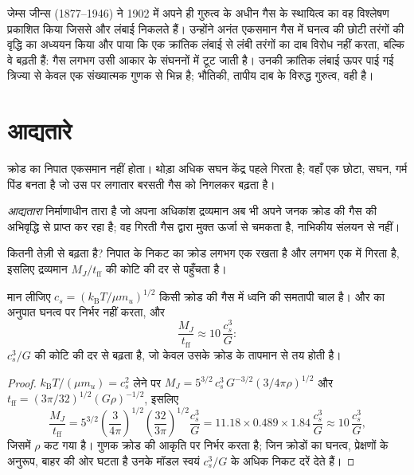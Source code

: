 \begin{history}[जेम्स जीन्स]
जेम्स जीन्स (1877--1946) ने 1902 में अपने ही गुरुत्व के अधीन गैस के स्थायित्व का
वह विश्लेषण प्रकाशित किया जिससे  और लंबाई निकलते हैं। उन्होंने
अनंत एकसमान गैस में घनत्व की छोटी तरंगों की वृद्धि का अध्ययन किया और
पाया कि एक क्रांतिक लंबाई से लंबी तरंगों का दाब विरोध नहीं करता,
बल्कि वे बढ़ती हैं: गैस लगभग उसी आकार के संघननों में टूट जाती है। उनकी क्रांतिक
लंबाई ऊपर पाई गई त्रिज्या से केवल एक संख्यात्मक गुणक से भिन्न है; भौतिकी,
तापीय दाब के विरुद्ध गुरुत्व, वही है।
\end{history}

\section{आद्यतारे}

क्रोड का निपात एकसमान नहीं होता। थोड़ा अधिक सघन केंद्र
पहले गिरता है; वहाँ एक छोटा, सघन, गर्म पिंड बनता है जो उस पर लगातार बरसती गैस को
निगलकर बढ़ता है।

\begin{definition}[आद्यतारा]\label{def:b2:ism-star-formation:protostar}
\emph{आद्यतारा} निर्माणाधीन तारा है जो अपना अधिकांश द्रव्यमान
अब भी अपने जनक क्रोड की गैस की अभिवृद्धि से प्राप्त कर रहा है; वह
गिरती गैस द्वारा मुक्त ऊर्जा से चमकता है, नाभिकीय संलयन से नहीं।
\end{definition}

 कितनी तेज़ी से बढ़ता है? निपात के निकट का क्रोड लगभग एक  रखता है
और लगभग एक  में गिरता है, इसलिए द्रव्यमान
$M_J/t_{\mathrm{ff}}$ की कोटि की दर से पहुँचता है।

\begin{proposition}[आद्यतारे की अभिवृद्धि-दर]
\label{prop:b2:ism-star-formation:accretion}
मान लीजिए $c_s = (k_{\mathrm B}T/\mu m_u)^{1/2}$ किसी क्रोड की गैस में ध्वनि की
समतापी चाल है।  और  का अनुपात
घनत्व पर निर्भर नहीं करता, और
\[
  \frac{M_J}{t_{\mathrm{ff}}} \approx 10\,\frac{c_s^3}{G}:
\]
 $c_s^3/G$ की कोटि की दर से बढ़ता है, जो केवल उसके क्रोड के
तापमान से तय होती है।
\end{proposition}

\begin{proof}
$k_{\mathrm B}T/(\mu m_u) = c_s^2$ लेने पर $M_J = 5^{3/2}\,c_s^3\,G^{-3/2}
(3/4\pi\rho)^{1/2}$ और $t_{\mathrm{ff}} = (3\pi/32)^{1/2}(G\rho)^{-1/2}$, इसलिए
\[
  \frac{M_J}{t_{\mathrm{ff}}} = 5^{3/2}\left(\frac{3}{4\pi}\right)^{1/2}
  \left(\frac{32}{3\pi}\right)^{1/2}\frac{c_s^3}{G}
  = 11.18\times0.489\times1.84\,\frac{c_s^3}{G} \approx 10\,\frac{c_s^3}{G},
\]
जिसमें $\rho$ कट गया है। गुणक क्रोड की आकृति पर निर्भर करता है;
जिन क्रोडों का घनत्व, प्रेक्षणों के अनुरूप, बाहर की ओर घटता है उनके मॉडल
स्वयं $c_s^3/G$ के अधिक निकट दरें देते हैं।
\end{proof}

